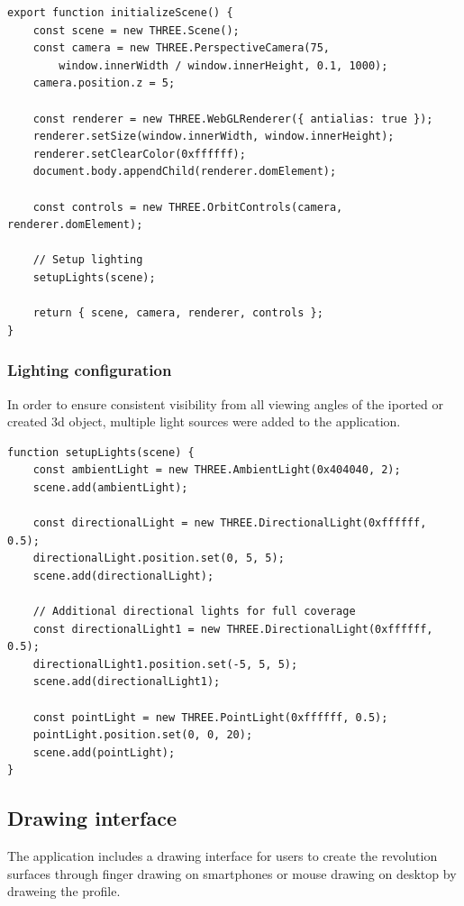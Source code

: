 \begin{verbatim}
export function initializeScene() {
    const scene = new THREE.Scene();
    const camera = new THREE.PerspectiveCamera(75, 
        window.innerWidth / window.innerHeight, 0.1, 1000);
    camera.position.z = 5;

    const renderer = new THREE.WebGLRenderer({ antialias: true });
    renderer.setSize(window.innerWidth, window.innerHeight);
    renderer.setClearColor(0xffffff);
    document.body.appendChild(renderer.domElement);

    const controls = new THREE.OrbitControls(camera, renderer.domElement);

    // Setup lighting
    setupLights(scene);

    return { scene, camera, renderer, controls };
}
\end{verbatim}

\subsubsection{Lighting configuration}

In order to ensure consistent visibility from all viewing angles of the iported or created 3d object, multiple light sources were added to the application.

\begin{verbatim}
function setupLights(scene) {
    const ambientLight = new THREE.AmbientLight(0x404040, 2);
    scene.add(ambientLight);

    const directionalLight = new THREE.DirectionalLight(0xffffff, 0.5);
    directionalLight.position.set(0, 5, 5);
    scene.add(directionalLight);

    // Additional directional lights for full coverage
    const directionalLight1 = new THREE.DirectionalLight(0xffffff, 0.5);
    directionalLight1.position.set(-5, 5, 5);
    scene.add(directionalLight1);

    const pointLight = new THREE.PointLight(0xffffff, 0.5);
    pointLight.position.set(0, 0, 20);
    scene.add(pointLight);
}
\end{verbatim}

\subsection{Drawing interface}

The application includes a drawing interface for users to create the revolution surfaces through finger drawing on smartphones or mouse drawing on desktop by draweing the profile.

